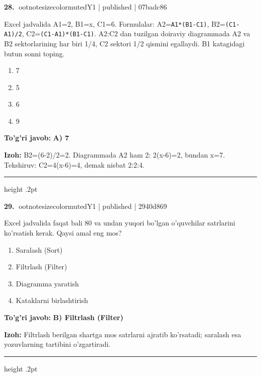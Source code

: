 \documentclass[10pt,a4paper]{article}
\begin{document}
\textbf{\color{ink}28.} {ootnotesizecolor{muted}Y1 | published | 07badc86}
\par
Excel jadvalida A1=2, B1=x, C1=6. Formulalar: A2=\texttt{A1*(B1-C1)}, B2=\texttt{(C1-A1)/2}, C2=\texttt{(C1-A1)*(B1-C1)}. A2:C2 dan tuzilgan doiraviy diagrammada A2 va B2 sektorlarining har biri 1/4, C2 sektori 1/2 qismini egallaydi. B1 katagidagi butun sonni toping.
\begin{enumerate}[label=\Alph*),leftmargin=9mm]
\item 7
\item 5
\item 6
\item 9
\end{enumerate}
\begin{tcolorbox}[enhanced,breakable,colback=teal!4,colframe=teal!55!black,boxrule=0.45pt,arc=1.2mm,left=2.8mm,right=2.8mm,top=2mm,bottom=2mm]
\textbf{\color{teal}To'g'ri javob:} \textbf{A) 7}
\par\smallskip
\textbf{Izoh:} B2=(6-2)/2=2. Diagrammada A2 ham 2: 2(x-6)=2, bundan x=7. Tekshiruv: C2=4(x-6)=4, demak nisbat 2:2:4.
\end{tcolorbox}
\vspace{2mm}\hrule height .2pt\vspace{2mm}

\textbf{\color{ink}29.} {ootnotesizecolor{muted}Y1 | published | 2940d869}
\par
Excel jadvalida faqat bali 80 va undan yuqori bo'lgan o'quvchilar satrlarini ko'rsatish kerak. Qaysi amal eng mos?
\begin{enumerate}[label=\Alph*),leftmargin=9mm]
\item Saralash (Sort)
\item Filtrlash (Filter)
\item Diagramma yaratish
\item Kataklarni birlashtirish
\end{enumerate}
\begin{tcolorbox}[enhanced,breakable,colback=teal!4,colframe=teal!55!black,boxrule=0.45pt,arc=1.2mm,left=2.8mm,right=2.8mm,top=2mm,bottom=2mm]
\textbf{\color{teal}To'g'ri javob:} \textbf{B) Filtrlash (Filter)}
\par\smallskip
\textbf{Izoh:} Filtrlash berilgan shartga mos satrlarni ajratib ko'rsatadi; saralash esa yozuvlarning tartibini o'zgartiradi.
\end{tcolorbox}
\vspace{2mm}\hrule height .2pt\vspace{2mm}
\end{document}
